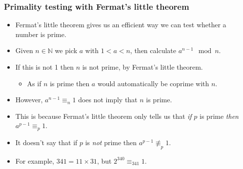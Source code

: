 \documentclass[handout]{beamer}
\newcommand{\bN}{\mathbb{N}}
\begin{document}
\begin{frame}
\frametitle{Primality testing with Fermat's little theorem}
\begin{itemize}
\item Fermat's little theorem gives us an efficient way we can test whether a number is prime. 
\vspace{0.2cm} 
\item Given $n\in \bN$ we pick $a$ with $1<a<n$, then calculate $a^{n-1} \mod n$. 
\vspace{0.2cm} 
\item If this is not 1 then $n$ is not prime, by Fermat's little theorem.
\begin{itemize}
\item As if $n$ is prime then $a$ would automatically be coprime with $n$.
\end{itemize} 
\vspace{0.2cm} 
\item However, $a^{n-1} \equiv_n 1$ does not imply that $n$ is prime. 
\vspace{0.2cm} 
\item This is because Fermat's little theorem only tells us that \emph{if} $p$ is prime \emph{then} $a^{p-1}\equiv_p 1$. 
\vspace{0.2cm} 
\item It doesn't say that if $p$ is \emph{not} prime then $a^{p-1}\not\equiv_p 1$. 
\vspace{0.2cm} 
\item For example, $341 = 11\times31$, but $2^{340} \equiv_{341} 1$. 
\end{itemize}
\end{frame}
\end{document}
